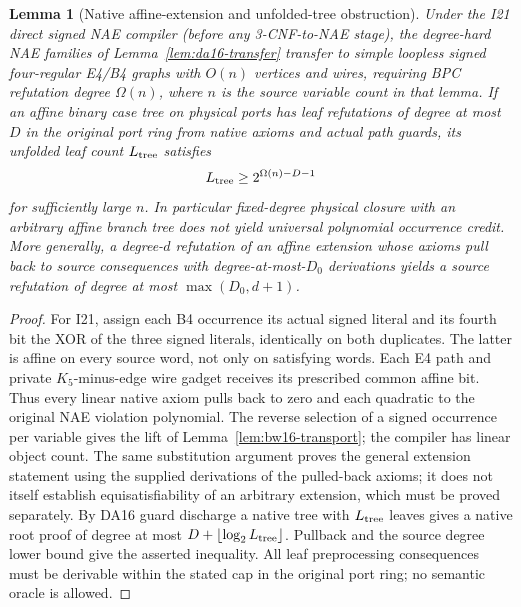 \documentclass[11pt]{article}
\newtheorem{lemma}[theorem]{Lemma}
\begin{document}
\begin{lemma}[Native affine-extension and unfolded-tree obstruction]\label{lem:bw16-tree}
Under the I21 direct signed NAE compiler (before any 3-CNF-to-NAE stage), the degree-hard NAE families of Lemma~\ref{lem:da16-transfer} transfer to simple loopless signed four-regular E4/B4 graphs with $O(n)$ vertices and wires, requiring BPC refutation degree $\Omega(n)$, where $n$ is the source variable count in that lemma. If an affine binary case tree on physical ports has leaf refutations of degree at most $D$ in the original port ring from native axioms and actual path guards, its unfolded leaf count $L_{\rm tree}$ satisfies
\[
 L_{\rm tree}\ge 2^{\Omega(n)-D-1}
\]
for sufficiently large $n$. In particular fixed-degree physical closure with an arbitrary affine branch tree does not yield universal polynomial occurrence credit. More generally, a degree-$d$ refutation of an affine extension whose axioms pull back to source consequences with degree-at-most-$D_0$ derivations yields a source refutation of degree at most $\max(D_0,d+1)$.
\end{lemma}
\begin{proof}
For I21, assign each B4 occurrence its actual signed literal and its fourth bit the XOR of the three signed literals, identically on both duplicates. The latter is affine on every source word, not only on satisfying words. Each E4 path and private $K_5$-minus-edge wire gadget receives its prescribed common affine bit. Thus every linear native axiom pulls back to zero and each quadratic to the original NAE violation polynomial. The reverse selection of a signed occurrence per variable gives the lift of Lemma~\ref{lem:bw16-transport}; the compiler has linear object count. The same substitution argument proves the general extension statement using the supplied derivations of the pulled-back axioms; it does not itself establish equisatisfiability of an arbitrary extension, which must be proved separately. By DA16 guard discharge a native tree with $L_{\rm tree}$ leaves gives a native root proof of degree at most $D+\lfloor\log_2 L_{\rm tree}\rfloor$. Pullback and the source degree lower bound give the asserted inequality. All leaf preprocessing consequences must be derivable within the stated cap in the original port ring; no semantic oracle is allowed.
\end{proof}
\end{document}
